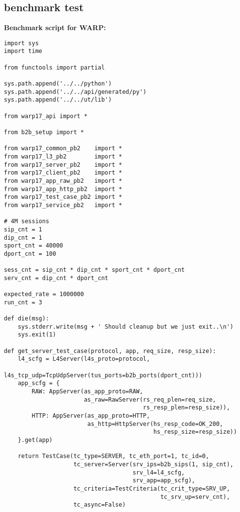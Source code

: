 \begin{landscape}
\section{benchmark test}\label{app:benchmark}

\textbf{Benchmark script for WARP:}
\begin{verbatim}
import sys
import time

from functools import partial

sys.path.append('../../python')
sys.path.append('../../api/generated/py')
sys.path.append('../../ut/lib')

from warp17_api import *

from b2b_setup import *

from warp17_common_pb2    import *
from warp17_l3_pb2        import *
from warp17_server_pb2    import *
from warp17_client_pb2    import *
from warp17_app_raw_pb2   import *
from warp17_app_http_pb2  import *
from warp17_test_case_pb2 import *
from warp17_service_pb2   import *

# 4M sessions
sip_cnt = 1
dip_cnt = 1
sport_cnt = 40000
dport_cnt = 100

sess_cnt = sip_cnt * dip_cnt * sport_cnt * dport_cnt
serv_cnt = dip_cnt * dport_cnt

expected_rate = 1000000
run_cnt = 3

def die(msg):
    sys.stderr.write(msg + ' Should cleanup but we just exit..\n')
    sys.exit(1)

def get_server_test_case(protocol, app, req_size, resp_size):
    l4_scfg = L4Server(l4s_proto=protocol,
                       l4s_tcp_udp=TcpUdpServer(tus_ports=b2b_ports(dport_cnt)))
    app_scfg = {
        RAW: AppServer(as_app_proto=RAW,
                       as_raw=RawServer(rs_req_plen=req_size,
                                        rs_resp_plen=resp_size)),
        HTTP: AppServer(as_app_proto=HTTP,
                        as_http=HttpServer(hs_resp_code=OK_200,
                                           hs_resp_size=resp_size))
    }.get(app)

    return TestCase(tc_type=SERVER, tc_eth_port=1, tc_id=0,
                    tc_server=Server(srv_ips=b2b_sips(1, sip_cnt),
                                     srv_l4=l4_scfg,
                                     srv_app=app_scfg),
                    tc_criteria=TestCriteria(tc_crit_type=SRV_UP,
                                             tc_srv_up=serv_cnt),
                    tc_async=False)


\end{verbatim}
\end{landscape}
